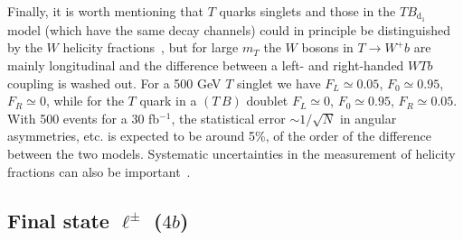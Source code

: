 \documentclass[12pt,a4paper]{article}
\newcommand{\fbin}{fb$^{-1}$}
\newcommand{\TBd}{TB_{\text{d}_1}}
\newcommand{\TB}{(T \, B)}
\begin{document}
Finally, it is worth mentioning that $T$ quarks singlets and those in the $\TBd$ model (which have the same decay channels) could in principle be distinguished by the $W$ helicity fractions~\cite{Kane:1991bg}, but for large $m_T$ the $W$ bosons in $T \to W^+ b$ are mainly longitudinal and the difference between a left- and right-handed $WTb$ coupling is washed out. For a 500 GeV $T$ singlet we have
$F_L \simeq  0.05$, $F_0 \simeq  0.95$, $F_R \simeq 0$, while for the $T$ quark in
a $\TB$ doublet $F_L \simeq  0$, $F_0 \simeq  0.95$, $F_R \simeq 0.05$. With 500 events for a 30 \fbin, the statistical error $\sim 1/\sqrt N$ in angular asymmetries, etc. is expected to be around 5\%, of the order of the difference between the two models. Systematic uncertainties in the measurement of helicity fractions can also be important~\cite{AguilarSaavedra:2007rs}.
 


\subsection{Final state $\ell^\pm$ ($4b$)}
\end{document}

